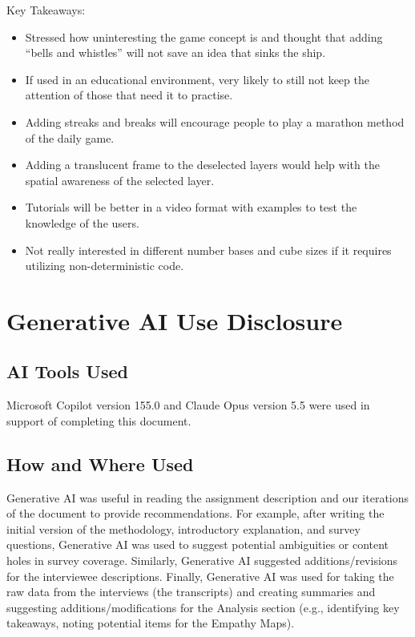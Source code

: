 \documentclass{article}
\begin{document}
Key Takeaways:

\begin{itemize}
  \item Stressed how uninteresting the game concept is and thought that adding ``bells and whistles'' will not save an idea that sinks the ship.
  \item If used in an educational environment, very likely to still not keep the attention of those that need it to practise.
  \item Adding streaks and breaks will encourage people to play a marathon method of the daily game.
  \item Adding a translucent frame to the deselected layers would help with the spatial awareness of the selected layer.
  \item Tutorials will be better in a video format with examples to test the knowledge of the users.
  \item Not really interested in different number bases and cube sizes if it requires utilizing non-deterministic code.
\end{itemize}

\appendix

\section{Generative AI Use Disclosure}

\subsection{AI Tools Used}

Microsoft Copilot version 155.0 and Claude Opus version 5.5 were used in support of completing this document.

\subsection{How and Where Used}

Generative AI was useful in reading the assignment description and our iterations of the document to provide recommendations. For example, after writing the initial version of the methodology, introductory explanation, and survey questions, Generative AI was used to suggest potential ambiguities or content holes in survey coverage. Similarly, Generative AI suggested additions/revisions for the interviewee descriptions. Finally, Generative AI was used for taking the raw data from the interviews (the transcripts) and creating summaries and suggesting additions/modifications for the Analysis section (e.g., identifying key takeaways, noting potential items for the Empathy Maps).
\end{document}
